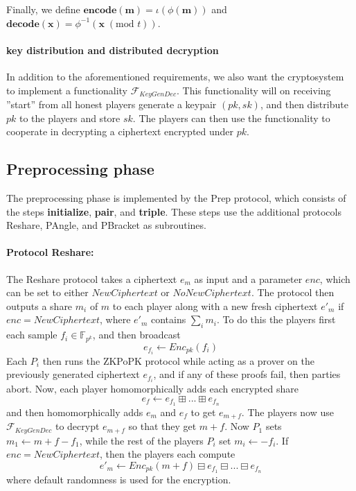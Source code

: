 \documentclass[../main.tex]{subfiles}
\begin{document}
Finally, we define $\textbf{encode}(\textbf{m}) = \iota(\phi(\textbf{m}))$ and $\textbf{decode}(\textbf{x}) = \phi^{-1}(\textbf{x} \; (\text{mod } t))$.

\paragraph{key distribution and distributed decryption}
In addition to the aforementioned requirements, we also want the cryptosystem to implement a functionality $\mathcal{F}_{KeyGenDec}$. This functionality will on receiving ''start'' from all honest players generate a keypair $(pk, sk)$, and then distribute $pk$ to the players and store $sk$. The players can then use the functionality to cooperate in decrypting a ciphertext encrypted under $pk$.

\subsection{Preprocessing phase} \label{subsection: Prep}
The preprocessing phase is implemented by the Prep protocol, which consists of the steps \textbf{initialize}, \textbf{pair}, and \textbf{triple}. These steps use the additional protocols Reshare, PAngle, and PBracket as subroutines.

\paragraph{Protocol Reshare:} The Reshare protocol takes a ciphertext $e_m$ as input and a parameter $enc$, which can be set to either $NewCiphertext$ or $NoNewCiphertext$. The protocol then outputs a share $m_i$ of $m$ to each player along with a new fresh ciphertext $e'_m$ if $enc = NewCiphertext$, where $e'_m$ contains $\sum_i m_i$.
To do this the players first each sample $f_i \in \mathbb{F}_{p^k}$, and then broadcast $$e_{f_i} \leftarrow Enc_{pk}(f_i)$$
Each $P_i$ then runs the ZKPoPK protocol while acting as a prover on the previously generated ciphertext $e_{f_i}$, and if any of these proofs fail, then parties abort.
Now, each player homomorphically adds each encrypted share
$$e_f \leftarrow e_{f_1} \boxplus ... \boxplus e_{f_n} $$
and then homomorphically adds $e_m$ and $e_f$ to get $e_{m + f}$. The players now use $\mathcal{F}_{KeyGenDec}$ to decrypt $e_{m + f}$ so that they get $m + f$. Now $P_1$ sets $m_1 \leftarrow m + f - f_1$, while the rest of the players $P_i$ set $m_i \leftarrow - f_i$.
If $enc = NewCiphertext$, then the players each compute
$$e'_m \leftarrow Enc_{pk}(m + f) \boxminus e_{f_1} \boxminus ... \boxminus e_{f_n}$$ where default randomness is used for the encryption.
\end{document}
